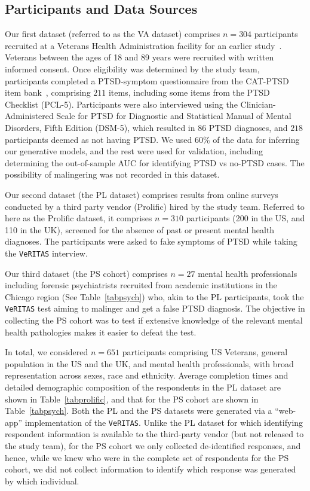 \documentclass[onecolumn,10pt]{IEEEtran}
\def\vrts{\texttt{VeRITAS}\xspace}
\begin{document}
\subsection*{Participants and Data Sources}
Our  first   dataset  (referred to as the VA dataset)  comprises  {\color{Red1}$n=304$} participants  recruited at a Veterans Health Administration facility for an earlier study~\cite{brenner2021development}. Veterans  between the ages of 18 and 89 years were recruited with written informed consent. Once eligibility was determined by the study team, participants completed a PTSD-symptom questionnaire from the CAT-PTSD item bank~\cite{gibbons2012development,brenner2021development}, comprising $211$ items, including some items from the  PTSD Checklist (PCL-5). Participants  were also interviewed using the Clinician-Administered Scale for PTSD for Diagnostic and Statistical Manual of Mental Disorders, Fifth Edition (DSM-5), which resulted in $86$ PTSD  diagnoses, and $218$ participants  deemed as not having PTSD. We used {\color{Red1} 60\%} of the data for inferring our generative models, and the rest were used for validation, including determining the out-of-sample AUC for identifying PTSD vs no-PTSD cases. The possibility of malingering was not recorded in this dataset.

Our second dataset  (the PL dataset) comprises results from online surveys conducted by a third party vendor (Prolific) hired by the study team. Referred to here as the Prolific dataset, it comprises {\color{Red1}$n= 310$} participants (200 in the US, and 110 in the UK), screened for the absence of past or present mental health diagnoses. The participants were asked to fake symptoms of PTSD while taking the \vrts interview.

Our third dataset (the PS cohort) comprises {\color{Red1} $n=27$} mental health professionals including   forensic psychiatrists  recruited from academic institutions in the Chicago region (See Table~\ref{tabpsych}) who, akin to the PL participants, took the \vrts test aiming to malinger and get a false PTSD diagnosis. The objective in collecting the PS cohort was to test if extensive knowledge of the relevant mental health pathologies makes it easier to defeat the test.

In total, we considered {\color{Red1} $n=651$} participants comprising  US Veterans,  general population in the US and the UK, and  mental health professionals, with broad representation across sexes, race and ethnicity.   Average completion times and detailed demographic composition of the respondents in the PL dataset  are shown in Table~\ref{tabprolific}, and that for the PS cohort are shown in Table~\ref{tabpsych}. Both the PL and the PS datasets were generated via   a ``web-app'' implementation of the \vrts. Unlike the PL dataset for which identifying respondent information is available to the third-party vendor (but not released to the study team), for the PS cohort we only collected de-identified responses, and hence, while we knew who were in the complete set of respondents for the PS cohort, we did not collect  information to identify which response was generated by which individual.
\end{document}
